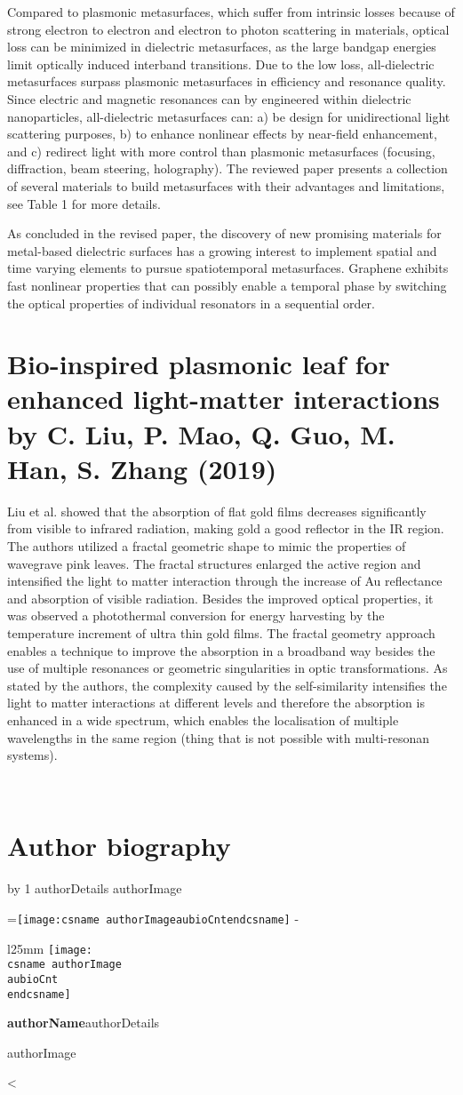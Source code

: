 \documentclass[11pt]{article}
\makeatletter
\newcounter{aubio}
\newcommand{\checkheight}[1]{%
  \par \penalty-100\begingroup%
  \setbox8=\hbox{#1}%
  \setlength{\dimen@}{\ht8}%
  \dimen@ii\pagegoal \advance\dimen@ii-\pagetotal
  \ifdim \dimen@>\dimen@ii
    \break
  \fi\endgroup}
\def\printBio{%
  \@tempcnta=0
   \loop
     \advance \@tempcnta by 1
     \def\aubioCnt{\the\@tempcnta}
     \setlength{\intextsep}{0pt}%
     \setlength{\columnsep}{10pt}%
     \newbox\boxa%
     \setbox\boxa\vbox{\csname authorDetails\aubioCnt\endcsname}
     \expandafter\ifx\csname authorImage\aubioCnt\endcsname\relax%
      \else%
       \checkheight{\texttt{[image: \\csname authorImage\\aubioCnt\\endcsname]}}
        \begin{wrapfigure}{l}{25mm}
         \texttt{[image: \\csname authorImage\\aubioCnt\\endcsname]}%
        \end{wrapfigure}\par
      \fi
     {\parindent0pt\textbf{\csname authorName\aubioCnt\endcsname}\csname authorDetails\aubioCnt\endcsname \par\bigskip%
     \expandafter\ifx\csname authorImage\aubioCnt\endcsname\relax\else%
      \ifdim\the\ht\boxa < 90pt\vskip\dimexpr(90pt -\the\ht\boxa-1pc)\fi%
     \fi}%
      \ifnum\@tempcnta < \theaubio
   \repeat
   }
\makeatother
\begin{document}
Compared to plasmonic metasurfaces, which suffer from intrinsic losses because of strong electron to electron and electron to photon scattering in materials, optical loss can be minimized in dielectric metasurfaces, as the large bandgap energies limit optically induced interband transitions. Due to the low loss, all-dielectric metasurfaces surpass plasmonic metasurfaces in efficiency and resonance quality. Since electric and magnetic resonances can by engineered within dielectric nanoparticles, all-dielectric metasurfaces can: a) be design for unidirectional light scattering purposes, b) to enhance nonlinear effects by near-field enhancement, and c) redirect light with more control than plasmonic metasurfaces (focusing, diffraction, beam steering, holography). The reviewed paper presents a collection of several materials to build metasurfaces with their advantages and limitations, see Table 1 for more details.

As concluded in the revised paper, the discovery of new promising materials for metal-based dielectric surfaces has a growing interest to implement spatial and time varying elements to pursue spatiotemporal metasurfaces. Graphene exhibits fast nonlinear properties that can possibly enable a temporal phase by switching the optical properties of individual resonators in a sequential order. ~
    
\section{Bio-inspired plasmonic leaf for enhanced light-matter interactions by C. Liu, P. Mao, Q. Guo, M. Han, S. Zhang (2019) \unskip~\protect\cite{691550:18173607}}
Liu et al. showed that the absorption of flat gold films decreases significantly from visible to infrared radiation, making gold a good reflector in the IR region. The authors utilized a fractal geometric shape to mimic the properties of wavegrave pink leaves. The fractal structures enlarged the active region and intensified the light to matter interaction through the increase of Au reflectance and absorption of visible radiation. Besides the improved optical properties, it was observed a photothermal conversion for energy harvesting by the temperature increment of ultra thin gold films. The fractal geometry approach enables a technique to improve the absorption in a broadband way besides the use of multiple resonances or geometric singularities in optic transformations. As stated by the authors, the complexity caused by the self-similarity intensifies the light to matter interactions at different levels and therefore the absorption is enhanced in a wide spectrum, which enables the localisation of multiple wavelengths in the same region (thing that is not possible with multi-resonan systems).\clearpage 

~


    





\section*{Author biography}

\printBio 
\end{document}
